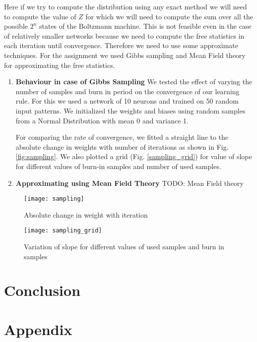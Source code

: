 \documentclass{article}
\begin{document}
Here if we try to compute the distribution using any exact method we will need
to compute the value of $ Z $ for which we will need to compute the sum over
all the possible $ 2^n $ states of the Boltzmann machine. This is not feasible 
even in the case of relatively smaller networks because we need to compute the 
free statistics in each iteration until convergence. Therefore we need to use
some approximate techniques. For the assignment we used Gibbs sampling and 
Mean Field theory for approximating the free statistics.

\begin{enumerate}
  \item \textbf{Behaviour in case of Gibbs Sampling}
    We tested the effect of varying the number of samples and burn in period on
    the convergence of our learning rule. For this we used a network of 10 
    neurons and trained on 50 random input patterns. We initialized the weights
    and biases using random samples from a Normal Distribution with mean 0 and 
    variance 1.

    For comparing the rate of convergence, we fitted a straight line to the 
    absolute change in weights with number of iterations as shown in Fig. 
    \ref{fig:sampling}. We also plotted a grid (Fig. \ref{sampling_grid}) for 
    value of slope for different values of burn-in samples and number of used
    samples.


  \item \textbf{Approximating using Mean Field Theory}
    TODO: Mean Field theory

\end{enumerate}

\begin{figure}[h]
  \centering
  \texttt{[image: sampling]}
  \caption{Absolute change in weight with iteration}
  \label{fig:noise_vs_acc}
\end{figure}

\begin{figure}[h]
  \centering
  \texttt{[image: sampling\_grid]}
  \caption{Variation of slope for different values of used samples and burn in 
  samples}
  \label{fig:noise_vs_acc}
\end{figure}

\section{Conclusion}

\section{Appendix}
\end{document}
